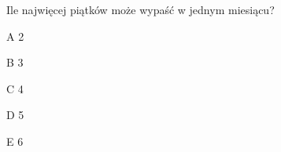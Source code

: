 \begin{tresc}
Ile najwięcej piątków może wypaść w jednym miesiącu?
\end{tresc}
\begin{wariant}{A} 2 \end{wariant}
\begin{wariant}{B} 3 \end{wariant}
\begin{wariant}{C} 4 \end{wariant}
\begin{wariant}{D} 5 \end{wariant}
\begin{wariant}{E} 6 \end{wariant}
